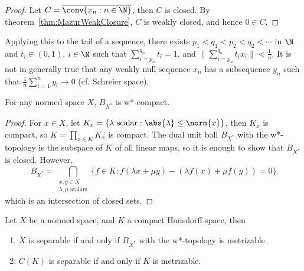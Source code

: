 \documentclass[a4paper]{article}
\begin{document}
\begin{proof}
  Let $C=\overline{\conv\{x_n:n\in\N\}}$, then $C$ is closed. By theorem~\ref{thm:MazurWeakClosure}, $C$ is weakly closed, and hence $0\in C$.
\end{proof}

\begin{remark}
  Applying this to the tail of a sequence, there exists $p_1<q_1<p_2<q_2<\cdots$ in $\N$ and $t_i\in(0,1)$, $i\in\N$ such that $\sum_{i=p_n}^{q_n}t_i=1$, and $\big\|\sum_{i=p_n}^{q_n}t_ix_i\big\|<\frac{1}{n}$. It is not in generally true that any weakly null sequence $x_n$ has a subsequence $y_n$ such that $\frac{1}{n}\sum_{i=1}^n y_i\to 0$ (cf. Schreier space).
\end{remark}

\begin{nthm}\label{thm:BanachAlaoglu}
  For any normed space $X$, $B_{X^*}$ is w*-compact.
\end{nthm}
\begin{proof}
  For $x\in X$, let $K_x=\{\lambda\text{ scalar}:\abs{\lambda}\leq\norm{x}\}$, then $K_x$ is compact, so $K=\prod_{x\in K}K_x$ is compact. The dual unit ball $B_{X^*}$ with the w*-topology is the subspace of $K$ of all linear maps, so it is enough to show that $B_{X^*}$ is closed. However,
  \[
    B_{X^*}=\bigcap_{\substack{x,y\in X\\ \lambda,\mu\text{ scalars}}}\{f\in K:f(\lambda x+\mu y)-(\lambda f(x)+\mu f(y))=0\}
  \]
which is an intersection of closed sets.
\end{proof}

\begin{nprop}\label{prop:DualBallMetrizable}
	 Let $X$ be a normed space, and $K$ a compact Hausdorff space, then
	\begin{enumerate}[label=(\roman*)]
		\item $X$ is separable if and only if $B_{X^*}$ with the w*-topology is metrizable.
		\item $C(K)$ is separable if and only if $K$ is metrizable.
	\end{enumerate}
\end{nprop}
\end{document}
